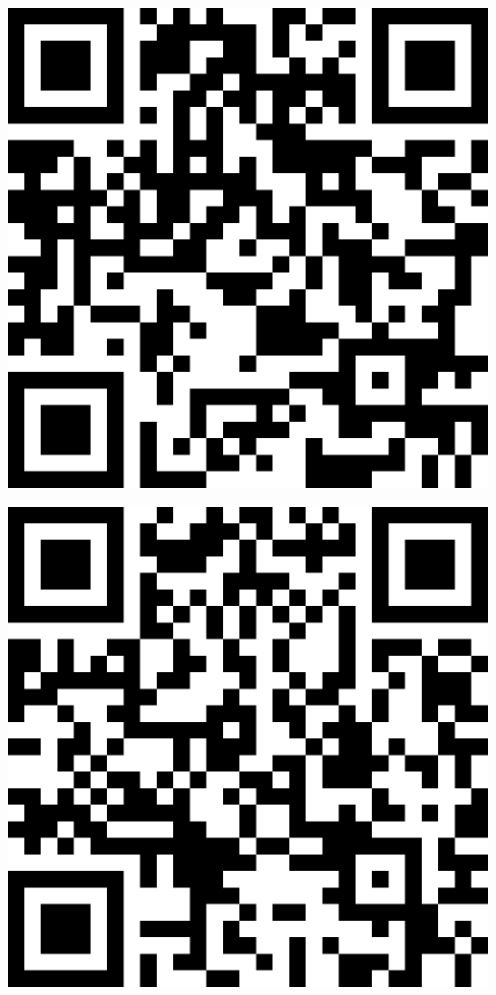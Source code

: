 \documentclass[letterpaper]{article}
\begin{document}
 \endgroup 
 \vspace*{\fill} 
 \pagebreak 
{} 
 \vspace*{\fill} 
 \begingroup 
 \centerline{\includegraphics[scale=1,width=5in,height=5in]{Office3615.png}} 
 \endgroup 
 \vspace*{\fill} 
 \pagebreak 
{} 
 \vspace*{\fill} 
 \begingroup 
 \centerline{\includegraphics[scale=1,width=5in,height=5in]{Office3617.png}} 
\end{document}
